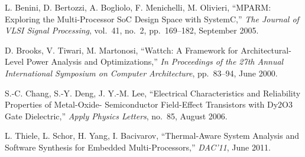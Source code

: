 \begin{thebibliography}{99}
    L. Benini, D. Bertozzi, A. Bogliolo, F. Menichelli, M. Olivieri,
    ``MPARM: Exploring the Multi-Processor SoC Design Space with SystemC,''
    \emph{The Journal of VLSI Signal Processing},
    vol.~41, no.~2, pp.~169--182, September 2005.

    D. Brooks, V. Tiwari, M. Martonosi,
    ``Wattch: A Framework for Architectural-Level Power Analysis and Optimizations,''
    \emph{In Proceedings of the 27th Annual International Symposium on Computer Architecture},
    pp.~83--94, June 2000.

    S.-C. Chang, S.-Y. Deng, J. Y.-M. Lee,
    ``Electrical Characteristics and Reliability Properties of Metal-Oxide- Semiconductor Field-Effect Transistors with Dy2O3 Gate Dielectric,''
    \emph{Apply Physics Letters},
    no.~85, August 2006.

    L. Thiele, L. Schor, H. Yang, I. Bacivarov,
    ``Thermal-Aware System Analysis and Software Synthesis for Embedded Multi-Processors,''
    \emph{DAC'11},
    June 2011.
\end{thebibliography}

